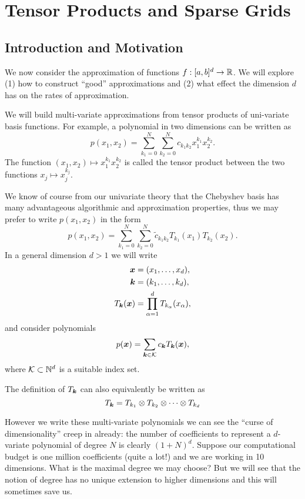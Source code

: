 
\section{Tensor Products and Sparse Grids}
%
\label{sec:sparse}

\subsection{Introduction and Motivation}
%
\label{sec:sparse:intro}
%
We now consider the approximation of functions $f : [a,b]^d \to \mathbb{R}$. We will
explore (1) how to construct ``good'' approximations and (2) what effect the
dimension $d$ has on the rates of approximation.

We will build multi-variate approximations from tensor products of uni-variate 
basis functions. For example, a polynomial in two dimensions can be written 
as 
\[
  p(x_1, x_2) = \sum_{k_1 = 0}^N \sum_{k_2 = 0}^N c_{k_1k_2} x_1^{k_1} x_2^{k_2}.
\]
The function $(x_1, x_2) \mapsto x_1^{k_1}x_2^{k_2}$ is called the tensor
product between the two functions $x_j \mapsto x_j^{k_j}$. 

We know of course from our univariate theory that the Chebyshev basis has 
many advantageous algorithmic and approximation properties, thus we may 
prefer to write $p(x_1, x_2)$ in the form 
\[
    p(x_1, x_2) = 
    \sum_{k_1 = 0}^N \sum_{k_2 = 0}^N  
    \tilde{c}_{k_1k_2} T_{k_1}(x_1) T_{k_2}(x_2).
\]
In a general dimension $d > 1$ we will write 
\begin{align*}
    {\bm x} &= (x_1, \dots, x_d), \\ 
    {\bm k} &= (k_1, \dots, k_d), \\ 
    T_{{\bm k}}({\bm x}) &= \prod_{\alpha = 1}^d T_{k_\alpha}(x_\alpha),
\end{align*}
and consider polynomials 
\[
    p({\bm x}) = \sum_{{\bm k} \in \mathcal{K}} c_{{\bm k}} T_{{\bm k}}({\bm x}),  
\]
where $\mathcal{K} \subset \mathbb{N}^d$ is a suitable index set. 

The definition of $T_{{\bm k}}$ can also equivalently be written as 
\[
    T_{{\bm k}} = T_{k_1} \otimes T_{k_2} \otimes \cdots \otimes T_{k_d}  
\]

However we write these multi-variate polynomials we can see the ``curse of
dimensionality'' creep in already: the number of coefficients to represent a
$d$-variate polynomial of degree $N$ is clearly $(1+N)^d$. Suppose our
computational budget is one million coefficients (quite a lot!) and we are
working in 10 dimensions. What is the maximal degree we may choose? But we will
see that the notion of degree has no unique extension to higher dimensions and
this will sometimes save us.

